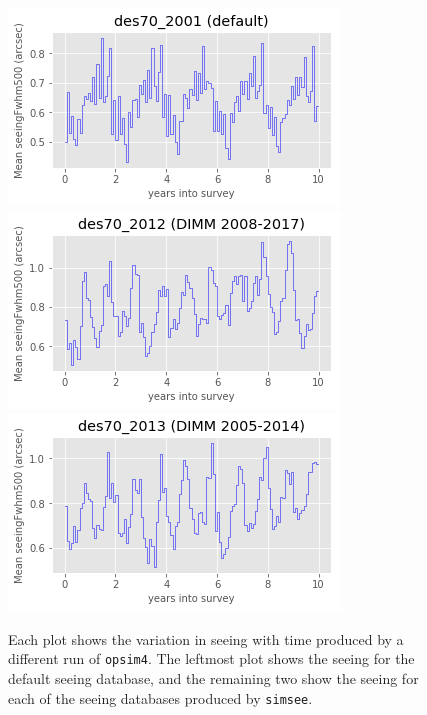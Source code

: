 \documentclass[\docopts]{\docclass}
\begin{document}
\begin{figure}
  \includegraphics[width=\columnwidth]{seeing_2001.png}
\endminipage\hfill
{}
  \includegraphics[width=\columnwidth]{seeing_2012.png}
\endminipage\hfill
{}
  \includegraphics[width=\columnwidth]{seeing_2013.png}
\endminipage\hfill
  \caption{Each plot shows the variation in seeing with time
    produced by a different run of \texttt{opsim4}. The leftmost plot
    shows the seeing for the default seeing database, and the
    remaining two show the seeing for each of the seeing databases
    produced by \texttt{simsee}.} 
  \label{fig:simseecomp}
\end{figure}
\end{document}

